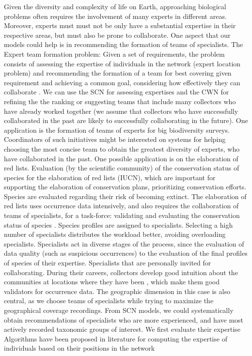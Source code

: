 Given the diversity and complexity of life on Earth, approaching biological problems often requires the involvement of many experts in different areas.
Moreover, experts must must not be only have a substantial expertise in their respective areas, but must also be prone to collaborate.
One aspect that our models could help is in recommending the formation of teams of specialists.
The Expert team formation problem:
Given a set of requirements, the problem consists of assessing the expertise of individuals in the network (expert location problem) and recommending the formation of a team for best covering given requirement and achieving a common goal, considering how effectively they can collaborate \cite{Lappas2001}.
We can use the SCN for assessing expertises and the CWN for refining the the ranking or suggesting teams that include many collectors who have already worked together (we assume that collectors who have successfully collaborated in the past are likely to successfully collaborating in the future).
%
One application is the formation of teams of experts for big biodiversity surveys.
Coordinators of such initiatives might be interested on systems for helping choosing the most concise team to obtain the greatest diversity of experts, who have collaborated in the past.
%
One possible application is on the elaboration of red lists.
Evaluation (by the scientific community) of the conservation status of species for the elaboration of red lists (IUCN), which are important for supporting the elaboration of conservation plans, prioritizing conservation efforts.
Species are evaluated regarding their risk of becoming extinct.
The elaboration of red lists uses occurrence data intensively, and also requires the collaboration of teams of specialists, for a task-force: validating and evaluating the conservation status of species \cite{Martinelli2013}.
Species profiles are assigned to specialists.
Selecting a high number of specialists distributes the workload better, avoiding overloading specialists.
Specialists act in diverse stages of the process, since the evaluation of data quality (such as suspicious occurrences) to the evaluation of the final profiles of species of their expertise.
Specialists that are personally invited for collaborating.
During their careers, collectors develop good intuition about the communities at locations where they have been \cite{Noss1996}, which make them good validators for occurrence data.
The geographic dimension in this case is also central, as we choose teams of specialists while trying to maximize the geographical coverage recordings.
From SCN models, we could systematically obtain recommendations of specialists who are more experienced, and have most actively recorded taxonomic groups of interest.
We first evaluate their expertise
Algorithms have been proposed in literature for computing the expertise of individuals based on their positions in the network \cite{Lappas2011}








